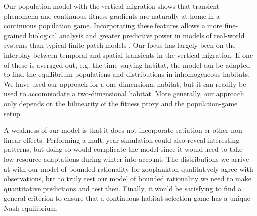 








Our population model with the vertical migration shows that transient phenomena and continuous fitness gradients \citep{kawecki2004conceptual} are naturally at home in a continuous population game. Incorporating these features allows a more fine-grained biological analysis and greater predictive power in models of real-world systems than typical finite-patch models \citep{kvrivan2008ideal, sadowski2019predator}. Our focus has largely been on the interplay between temporal and spatial transients in the vertical migration. If one of these is averaged out, e.g. the time-varying habitat, the model can be adapted to find the equilibrium populations and distributions in inhomogeneous habitats. We have used our approach for a one-dimensional habitat, but it can readily be used to accommodate a two-dimensional habitat. More generally, our approach only depends on the bilinearity of the fitness proxy and the population-game setup.



A weakness of our model is that it does not incorporate satiation or other non-linear effects. Performing a multi-year simulation could also reveal interesting patterns, but doing so would complicate the model since it would need to take low-resource adaptations during winter into account. The distributions we arrive at with our model of bounded rationality for zooplankton qualitatively agree with observations, but to truly test our model of bounded rationality we need to make quantitative predictions and test then. Finally, it would be satisfying to find a general criterion to ensure that a continuous habitat selection game has a unique Nash equilibrium.


